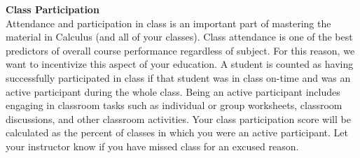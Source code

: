 \documentclass[12pt]{article}
\renewcommand{\emph}[1]{\textsf{\textbf{#1}}}
\newcommand{\localhead}[1]{\par\smallskip\textbf{#1}\nobreak\\}%
\def\heading#1{\localhead{\large\emph{#1}}}
\newenvironment{clist}%
{\bgroup\parskip 0pt\begin{list}{$\bullet$}{\partopsep 4pt\topsep 0pt\itemsep -2pt}}%
{\end{list}\egroup}%
\begin{document}
%

\heading{Class Participation}
Attendance and participation in class is an important part of mastering the material in Calculus (and all of your classes). Class attendance is one of the best predictors of overall course performance regardless of subject. For this reason, we want to incentivize this aspect of your education. A student is counted as having successfully participated in class if that student was in class on-time and was an active participant during the whole class. Being an active participant includes engaging in classroom tasks such as individual or group worksheets, classroom discussions, and other classroom activities. Your class participation score will be calculated as the percent of classes in which you were an active participant. Let your instructor know if you have missed class for an excused reason.
\end{document}
